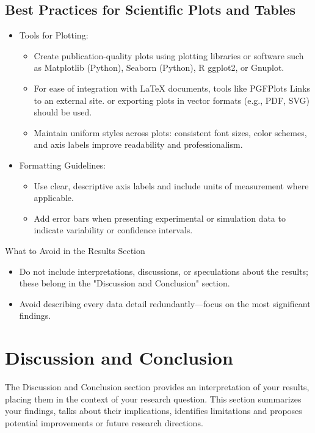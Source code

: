\documentclass[conference]{IEEEtran}
\begin{document}
\subsection{Best Practices for Scientific Plots and Tables}
\begin{itemize}
\item Tools for Plotting:  
\begin{itemize}
  \item Create publication-quality plots using plotting libraries or software such as Matplotlib (Python), Seaborn (Python), R ggplot2, or Gnuplot.  
  \item For ease of integration with LaTeX documents, tools like PGFPlots Links to an external site. or exporting plots in vector formats (e.g., PDF, SVG) should be used.  
  \item Maintain uniform styles across plots: consistent font sizes, color schemes, and axis labels improve readability and professionalism.  
\end{itemize}

\item Formatting Guidelines:  
\begin{itemize}
  \item Use clear, descriptive axis labels and include units of measurement where applicable.  
  \item Add error bars when presenting experimental or simulation data to indicate variability or confidence intervals.  
\end{itemize}
\end{itemize}

What to Avoid in the Results Section  
\begin{itemize}
\item Do not include interpretations, discussions, or speculations about the results; these belong in the "Discussion and Conclusion" section.  
\item Avoid describing every data detail redundantly—focus on the most significant findings.  
\end{itemize}
\section{Discussion and Conclusion}\label{sec:discussion}
The Discussion and Conclusion section provides an interpretation of your results, placing them in the context of your research question. This section summarizes your findings, talks about their implications, identifies limitations and proposes potential improvements or future research directions.
\end{document}
